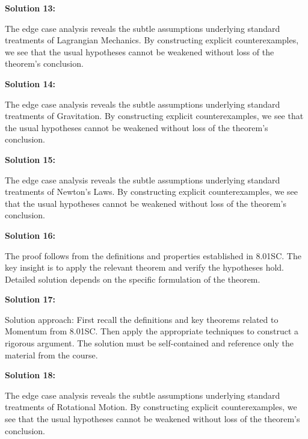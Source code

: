 \documentclass[12pt,a4paper]{exam}
\begin{document}
\vspace{0.5cm}

\textbf{Solution 13:}

The edge case analysis reveals the subtle assumptions underlying standard treatments of Lagrangian Mechanics. By constructing explicit counterexamples, we see that the usual hypotheses cannot be weakened without loss of the theorem's conclusion.

\vspace{0.5cm}

\textbf{Solution 14:}

The edge case analysis reveals the subtle assumptions underlying standard treatments of Gravitation. By constructing explicit counterexamples, we see that the usual hypotheses cannot be weakened without loss of the theorem's conclusion.

\vspace{0.5cm}

\textbf{Solution 15:}

The edge case analysis reveals the subtle assumptions underlying standard treatments of Newton's Laws. By constructing explicit counterexamples, we see that the usual hypotheses cannot be weakened without loss of the theorem's conclusion.

\vspace{0.5cm}

\textbf{Solution 16:}

The proof follows from the definitions and properties established in 8.01SC. The key insight is to apply the relevant theorem and verify the hypotheses hold. Detailed solution depends on the specific formulation of the theorem.

\vspace{0.5cm}

\textbf{Solution 17:}

Solution approach: First recall the definitions and key theorems related to Momentum from 8.01SC. Then apply the appropriate techniques to construct a rigorous argument. The solution must be self-contained and reference only the material from the course.

\vspace{0.5cm}

\textbf{Solution 18:}

The edge case analysis reveals the subtle assumptions underlying standard treatments of Rotational Motion. By constructing explicit counterexamples, we see that the usual hypotheses cannot be weakened without loss of the theorem's conclusion.
\end{document}
